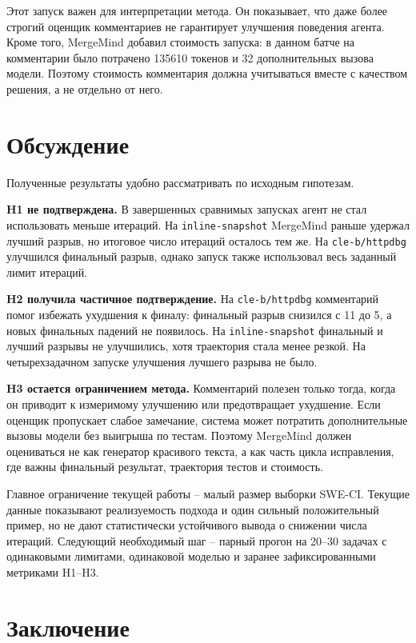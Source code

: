 \documentclass[12pt,a4paper]{article}
\begin{document}
Этот запуск важен для интерпретации метода. Он показывает, что даже более
строгий оценщик комментариев не гарантирует улучшения поведения агента. Кроме
того, MergeMind добавил стоимость запуска: в данном батче на комментарии было
потрачено 135610 токенов и 32 дополнительных вызова модели. Поэтому стоимость
комментария должна учитываться вместе с качеством решения, а не отдельно от
него.

\section{Обсуждение}

Полученные результаты удобно рассматривать по исходным гипотезам.

\textbf{H1 не подтверждена.} В завершенных сравнимых запусках агент не стал
использовать меньше итераций. На \texttt{inline-snapshot} MergeMind раньше
удержал лучший разрыв, но итоговое число итераций осталось тем же. На
\texttt{cle-b/httpdbg} улучшился финальный разрыв, однако запуск также
использовал весь заданный лимит итераций.

\textbf{H2 получила частичное подтверждение.} На \texttt{cle-b/httpdbg}
комментарий помог избежать ухудшения к финалу: финальный разрыв снизился с 11
до 5, а новых финальных падений не появилось. На \texttt{inline-snapshot}
финальный и лучший разрывы не улучшились, хотя траектория стала менее резкой.
На четырехзадачном запуске улучшения лучшего разрыва не было.

\textbf{H3 остается ограничением метода.} Комментарий полезен только тогда,
когда он приводит к измеримому улучшению или предотвращает ухудшение. Если
оценщик пропускает слабое замечание, система может потратить дополнительные
вызовы модели без выигрыша по тестам. Поэтому MergeMind должен оцениваться не
как генератор красивого текста, а как часть цикла исправления, где важны
финальный результат, траектория тестов и стоимость.

Главное ограничение текущей работы -- малый размер выборки SWE-CI. Текущие
данные показывают реализуемость подхода и один сильный положительный пример, но
не дают статистически устойчивого вывода о снижении числа итераций. Следующий
необходимый шаг -- парный прогон на 20--30 задачах с одинаковыми лимитами,
одинаковой моделью и заранее зафиксированными метриками H1--H3.

\section{Заключение}
\end{document}
